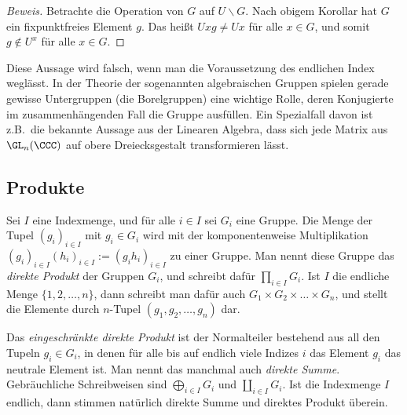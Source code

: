 \documentclass[12pt,a4paper,twoside]{article}
\newcommand{\ei}[1]{\emph{#1}\index{#1}}
\begin{document}
\begin{proof}[Beweis]
  Betrachte die Operation von $G$ auf $U\backslash G$. Nach obigem Korollar
  hat $G$ ein fixpunktfreies Element $g$. Das hei\ss t $Uxg\ne Ux$ f\"ur alle
  $x\in G$, und somit $g\notin U^x$ f\"ur alle $x\in G$.
\end{proof}
\begin{Bemerkung*}
  Diese Aussage wird falsch, wenn man die Voraussetzung des endlichen Index
  wegl\"asst. In der Theorie der sogenannten algebraischen Gruppen spielen
  gerade gewisse Untergruppen (die Borelgruppen) eine wichtige Rolle, deren
  Konjugierte im zusammenh\"angenden Fall die Gruppe ausf\"ullen. Ein
  Spezialfall davon ist z.B.\ die bekannte Aussage aus der Linearen Algebra,
  dass sich jede Matrix aus $\GL_n(\CCC)$ auf obere Dreiecksgestalt
  transformieren l\"asst.
\end{Bemerkung*}
\subsection{Produkte}
Sei $I$ eine Indexmenge, und f\"ur alle $i\in I$ sei $G_i$ eine Gruppe. Die
Menge der Tupel $(g_i)_{i\in I}$ mit $g_i\in G_i$ wird mit der
komponentenweise Multiplikation $(g_i)_{i\in I}(h_i)_{i\in I}:=(g_ih_i)_{i\in
  I}$ zu einer Gruppe. Man nennt diese Gruppe das \emph{direkte
  Produkt} der Gruppen $G_i$, und schreibt daf\"ur
$\prod_{i\in I}G_i$. Ist $I$ die endliche Menge $\{1,2,\dots,n\}$, dann
schreibt man daf\"ur auch $G_1\times G_2\times\dots\times G_n$, und stellt die
Elemente durch $n$-Tupel $(g_1,g_2,\dots,g_n)$ dar.

Das \emph{eingeschr\"ankte direkte Produkt} ist der Normalteiler bestehend aus all den Tupeln $g_i\in G_i$, in
  denen f\"ur alle bis auf endlich viele Indizes $i$ das Element $g_i$ das
  neutrale Element ist. Man nennt das manchmal auch \ei{direkte
  Summe}. Gebr\"auchliche Schreibweisen sind $\bigoplus_{i\in I}G_i$ und
  $\coprod_{i\in I}G_i$. Ist die Indexmenge $I$ endlich, dann stimmen
  nat\"urlich direkte Summe und direktes Produkt \"uberein.
\end{document}
